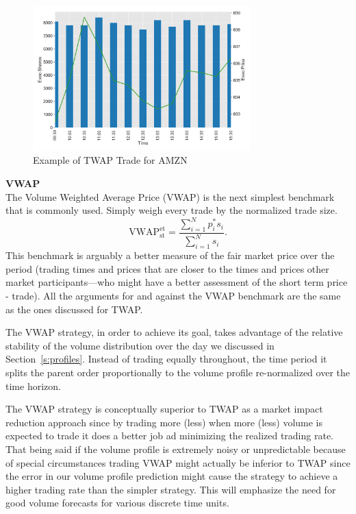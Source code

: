         \begin{figure}[!ht]
        \centering
        \includegraphics[width=0.75\textwidth]{chapters/chapter_exec_models/figures/twap.png} 
        \caption{Example of TWAP Trade for AMZN \label{fig:vwap}}
        \end{figure}


\noindent\textbf{VWAP} \\


The Volume Weighted Average Price (VWAP) is the next simplest benchmark that is commonly used. Simply weigh every trade by the normalized trade size.
        \begin{equation}
        \text{VWAP}_{\text{st}} ^{\text{et}}= \dfrac{ \sum_{i=1}^N p_i^* s_i }{ \sum_{i=1}^N s_i }.
        \end{equation}
This benchmark  is arguably a better measure of the fair market price over the period (trading times and prices that are closer to the times and prices other market participants---who might have a better assessment of the short term price - trade). All the arguments for and against the VWAP benchmark are the same as the ones discussed for TWAP.


The VWAP strategy, in order to achieve its goal, takes advantage of the relative stability of the volume distribution over the day we discussed in Section~\ref{s:profiles}. Instead of trading equally throughout, the time period it splits the parent order proportionally to the volume profile re-normalized over the time horizon.


The VWAP strategy is conceptually superior to TWAP as a market impact reduction approach since by trading more (less) when more  (less) volume is expected to trade it does a better job ad minimizing the realized trading rate. That being said if the volume profile is extremely noisy or unpredictable because of special circumstances trading VWAP might actually be inferior to TWAP since the error in our volume profile prediction might cause the strategy to achieve a higher trading rate than the simpler strategy. This will emphasize the need for good volume forecasts for various discrete time units.


